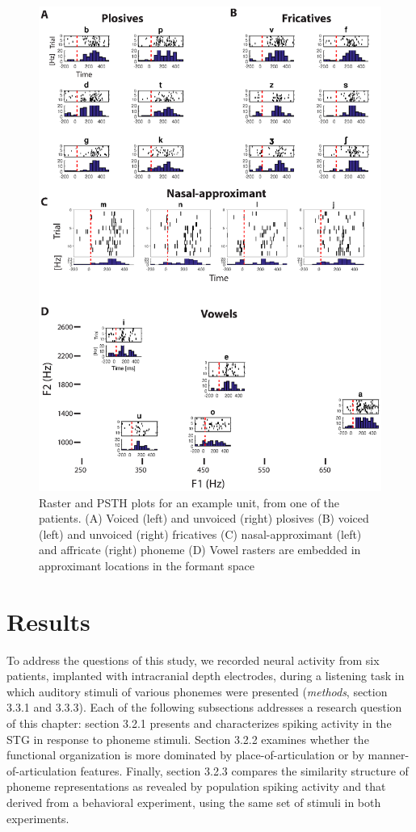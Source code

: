 \begin{figure}
\vspace{.3in}
\includegraphics[width=\linewidth]{Figures/Ch3/Figure2_new.eps}
\caption{Raster and PSTH plots for an example unit, from one of the patients. (A) Voiced (left) and unvoiced (right) plosives (B) voiced (left) and unvoiced (right) fricatives (C)  nasal-approximant (left) and affricate (right) phoneme (D) Vowel rasters are embedded in approximant locations in the formant space}
\end{figure}

\section{Results}
To address the questions of this study, we recorded neural activity from six patients, implanted with intracranial depth electrodes, during a listening task in which auditory stimuli of various phonemes were presented (\textit{methods}, section 3.3.1 and 3.3.3). Each of the following subsections addresses a research question of this chapter: section 3.2.1 presents and characterizes spiking activity in the STG in response to phoneme stimuli. Section 3.2.2 examines whether the functional organization is more dominated by place-of-articulation or by manner-of-articulation features. Finally, section 3.2.3 compares the similarity structure of phoneme representations as revealed by population spiking activity and that derived from a behavioral experiment, using the same set of stimuli in both experiments.

